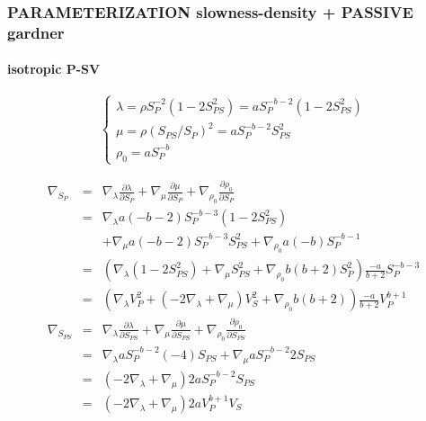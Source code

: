 \documentclass[9pt]{beamer}
\newcommand{\partderi}[2]{\frac{\partial#1}{\partial#2}}
\begin{document}
\begin{frame}\frametitle{PARAMETERIZATION slowness-density  + PASSIVE gardner}
\framesubtitle{isotropic P-SV}

  \begin{center}
  \end{center}
  
  \[\left\{ \begin{array}{l}
    \lambda = \rho S_P^{-2} (1-2S_{PS}^2) = a S_P^{-b-2} (1-2S_{PS}^2) \\
    \mu    = \rho (S_{PS}/S_P)^2 = a S_P^{-b-2} S_{PS}^2\\
    \rho_0 = a S_P^{-b}
  \end{array} \right.\]
  
  \begin{eqnarray}
    \nabla_{S_P} &=& \nabla_\lambda \partderi{\lambda}{S_P} + \nabla_\mu \partderi{\mu}{S_P} + \nabla_{\rho_0} \partderi{\rho_0}{S_P} \nonumber\\
		 &=& \nabla_\lambda a(-b-2)S_P^{-b-3}(1-2S_{PS}^2) \nonumber\\
		 & &+\nabla_\mu a(-b-2) S_P^{-b-3}S_{PS}^2 + \nabla_{\rho_0} a(-b)S_P^{-b-1} \nonumber\\
		 &=& \left(\nabla_\lambda (1-2S_{PS}^2) + \nabla_\mu S_{PS}^2 + \nabla_{\rho_0} b(b+2)S_P^2 \right) \frac{-a}{b+2} S_P^{-b-3} \nonumber\\
		 &=& \left(\nabla_\lambda V_P^2 + (-2\nabla_\lambda + \nabla_\mu) V_S^2 + \nabla_{\rho_0} b(b+2) \right) \frac{-a}{b+2} V_P^{b+1} \nonumber\\
    \nabla_{S_{PS}} &=& \nabla_\lambda \partderi{\lambda}{S_{PS}} + \nabla_\mu \partderi{\mu}{S_{PS}} + \nabla_{\rho_0} \partderi{\rho_0}{S_{PS}} \nonumber\\
		    &=& \nabla_\lambda a S_P^{-b-2} (-4)S_{PS} + \nabla_\mu a S_P^{-b-2} 2S_{PS} \nonumber\\
		    &=& \left(-2\nabla_\lambda + \nabla_\mu \right) 2aS_P^{-b-2}S_{PS} \nonumber\\
		    &=& \left(-2\nabla_\lambda + \nabla_\mu \right) 2aV_P^{b+1}V_S \nonumber
  \end{eqnarray}

\end{frame}
\end{document}
